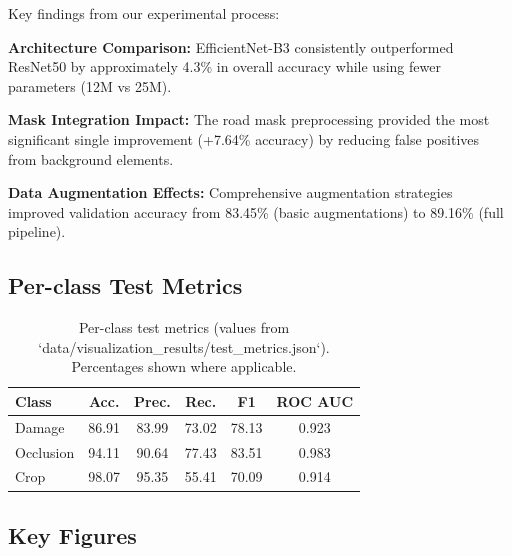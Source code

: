 \documentclass[12pt,twocolumn]{article}
\begin{document}
Key findings from our experimental process:

\textbf{Architecture Comparison:} EfficientNet-B3 consistently outperformed ResNet50 by approximately 4.3\% in overall accuracy while using fewer parameters (12M vs 25M).

\textbf{Mask Integration Impact:} The road mask preprocessing provided the most significant single improvement (+7.64\% accuracy) by reducing false positives from background elements.

\textbf{Data Augmentation Effects:} Comprehensive augmentation strategies improved validation accuracy from 83.45\% (basic augmentations) to 89.16\% (full pipeline).

\subsection{Per-class Test Metrics}

\begin{table}[h]
  \centering
  \begin{tabular}{lccccc}
    \toprule
    \textbf{Class} & Acc. & Prec. & Rec. & F1 & ROC AUC \\
    \midrule
    Damage & 86.91 & 83.99 & 73.02 & 78.13 & 0.923 \\
    Occlusion & 94.11 & 90.64 & 77.43 & 83.51 & 0.983 \\
    Crop & 98.07 & 95.35 & 55.41 & 70.09 & 0.914 \\
    \bottomrule
  \end{tabular}
  \caption{Per-class test metrics (values from `data/visualization\_results/test\_metrics.json`). Percentages shown where applicable.}
\end{table}

\subsection{Key Figures}
\end{document}
